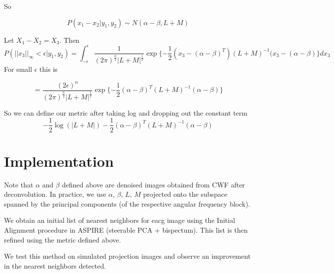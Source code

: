\documentclass[11pt]{article} %
\begin{document}
So

\begin{equation}
P(x_1 - x_2|y_1, y_2) \sim N(\alpha-\beta, L+M)
\end{equation}

Let $X_1 - X_2 = X_3$. Then
\begin{equation}
  P(||x_3||_{\infty} < \epsilon|y_1,y_2)   =  \int_{-\epsilon }^{\epsilon} \frac{1}{(2 \pi)^{\frac{n}{2}} |L+M|^ \frac{1}{2}} \exp \{ -\frac{1}{2}(x_3 - (\alpha -\beta)^T)(L+M)^{-1}(x_3 - (\alpha -\beta)\}dx_3 
\end{equation}
 For small $\epsilon$ this is

\begin{equation}
= \frac{(2 \epsilon)^n}{(2 \pi)^{\frac{n}{2}} |L + M|^{\frac{1}{2}}} \exp\{-\frac{1}{2}(\alpha - \beta)^T(L+M)^{-1}(\alpha -\beta)\} 
\end{equation}

So we can define our metric after taking log and dropping out the constant term
\begin{equation}
 -\frac{1}{2}\log(|L + M|) -\frac{1}{2}(\alpha - \beta)^T(L+M)^{-1}(\alpha -\beta)
\end{equation}

\section{Implementation}

Note that $\alpha$ and $\beta$ defined above are denoised images obtained from CWF after deconvolution. In practice, we use $\alpha$, $\beta$, $L$, $M$ projected onto the subspace spanned by the principal components (of the respective angular frequency block).

We obtain an initial list of nearest neighbors for eacg image using the Initial Alignment procedure in ASPIRE (steerable PCA + bispectum). This list is then refined using the metric defined above.

We test this method on simulated projection images and observe an improvement in the nearest neighbors detected. 
\end{document}
